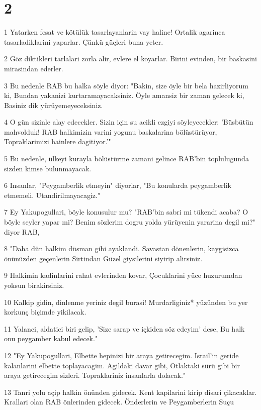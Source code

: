 \chapter{2}

\par 1 Yatarken fesat ve kötülük tasarlayanlarin vay haline! Ortalik agarinca tasarladiklarini yaparlar. Çünkü güçleri buna yeter.
\par 2 Göz diktikleri tarlalari zorla alir, evlere el koyarlar. Birini evinden, bir baskasini mirasindan ederler.
\par 3 Bu nedenle RAB bu halka söyle diyor: "Bakin, size öyle bir bela hazirliyorum ki, Bundan yakanizi kurtaramayacaksiniz. Öyle amansiz bir zaman gelecek ki, Basiniz dik yürüyemeyeceksiniz.
\par 4 O gün sizinle alay edecekler. Sizin için su acikli ezgiyi söyleyecekler: 'Büsbütün mahvolduk! RAB halkimizin varini yogunu baskalarina bölüstürüyor, Topraklarimizi hainlere dagitiyor.'"
\par 5 Bu nedenle, ülkeyi kurayla bölüstürme zamani gelince RAB'bin toplulugunda sizden kimse bulunmayacak.
\par 6 Insanlar, "Peygamberlik etmeyin" diyorlar, "Bu konularda peygamberlik etmemeli. Utandirilmayacagiz."
\par 7 Ey Yakupogullari, böyle konusulur mu? "RAB'bin sabri mi tükendi acaba? O böyle seyler yapar mi? Benim sözlerim dogru yolda yürüyenin yararina degil mi?" diyor RAB,
\par 8 "Daha dün halkim düsman gibi ayaklandi. Savastan dönenlerin, kaygisizca önünüzden geçenlerin Sirtindan Güzel giysilerini siyirip alirsiniz.
\par 9 Halkimin kadinlarini rahat evlerinden kovar, Çocuklarini yüce huzurumdan yoksun birakirsiniz.
\par 10 Kalkip gidin, dinlenme yeriniz degil burasi! Murdarliginiz* yüzünden bu yer korkunç biçimde yikilacak.
\par 11 Yalanci, aldatici biri gelip, 'Size sarap ve içkiden söz edeyim' dese, Bu halk onu peygamber kabul edecek."
\par 12 "Ey Yakupogullari, Elbette hepinizi bir araya getirecegim. Israil'in geride kalanlarini elbette toplayacagim. Agildaki davar gibi, Otlaktaki sürü gibi bir araya getirecegim sizleri. Topraklariniz insanlarla dolacak."
\par 13 Tanri yolu açip halkin önünden gidecek. Kent kapilarini kirip disari çikacaklar. Krallari olan RAB önlerinden gidecek. Önderlerin ve Peygamberlerin Suçu

